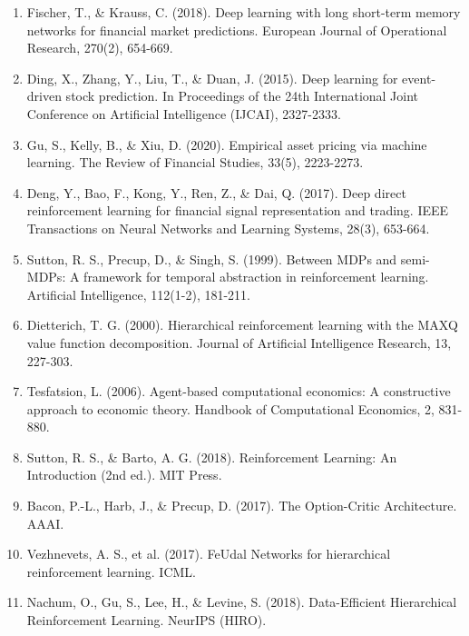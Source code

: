 \documentclass[11pt]{article}
\begin{document}
\begin{enumerate}
\item Fischer, T., \& Krauss, C. (2018). Deep learning with long short-term memory networks for financial market predictions. European Journal of Operational Research, 270(2), 654-669.

\item Ding, X., Zhang, Y., Liu, T., \& Duan, J. (2015). Deep learning for event-driven stock prediction. In Proceedings of the 24th International Joint Conference on Artificial Intelligence (IJCAI), 2327-2333.

\item Gu, S., Kelly, B., \& Xiu, D. (2020). Empirical asset pricing via machine learning. The Review of Financial Studies, 33(5), 2223-2273.

\item Deng, Y., Bao, F., Kong, Y., Ren, Z., \& Dai, Q. (2017). Deep direct reinforcement learning for financial signal representation and trading. IEEE Transactions on Neural Networks and Learning Systems, 28(3), 653-664.

\item Sutton, R. S., Precup, D., \& Singh, S. (1999). Between MDPs and semi-MDPs: A framework for temporal abstraction in reinforcement learning. Artificial Intelligence, 112(1-2), 181-211.

\item Dietterich, T. G. (2000). Hierarchical reinforcement learning with the MAXQ value function decomposition. Journal of Artificial Intelligence Research, 13, 227-303.

\item Tesfatsion, L. (2006). Agent-based computational economics: A constructive approach to economic theory. Handbook of Computational Economics, 2, 831-880.

\item Sutton, R. S., \& Barto, A. G. (2018). Reinforcement Learning: An Introduction (2nd ed.). MIT Press.

\item Bacon, P.-L., Harb, J., \& Precup, D. (2017). The Option-Critic Architecture. AAAI.

\item Vezhnevets, A. S., et al. (2017). FeUdal Networks for hierarchical reinforcement learning. ICML.

\item Nachum, O., Gu, S., Lee, H., \& Levine, S. (2018). Data-Efficient Hierarchical Reinforcement Learning. NeurIPS (HIRO).


\end{enumerate}
\end{document}
